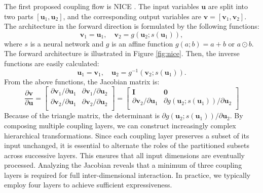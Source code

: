 The first proposed coupling flow is \ac{NICE} \citep{dinh2015nice}. The input variables $\boldsymbol{u}$ are split into two parts $[\boldsymbol{u}_1, \boldsymbol{u}_2]$, and the corresponding output variables are $\boldsymbol{v} = [\boldsymbol{v}_1, \boldsymbol{v}_2]$. The architecture in the forward direction is formulated by the following functions:
\begin{equation}
    \boldsymbol{v}_1 = \boldsymbol{u}_1, \quad \boldsymbol{v}_2 = g(\boldsymbol{u}_2;s(\boldsymbol{u}_1)),
\end{equation}
where $s$ is a neural network and $g$ is an affine function $g(a;b)=a+b$ or $a\odot b$. The forward architecture is illustrated in Figure \ref{fig:nice}.
Then, the inverse functions are easily calculated:
\begin{equation}
    \boldsymbol{u}_1 = \boldsymbol{v}_1,\quad \boldsymbol{u}_2 = g^{-1}(\boldsymbol{v}_2;s(\boldsymbol{u}_1)).
\end{equation}
From the above functions, the Jacobian matrix is:
\begin{equation}
\frac {\partial \boldsymbol{v}}{\partial \boldsymbol{u}}=\begin{bmatrix}
\partial \boldsymbol{v}_1/\partial \boldsymbol{u}_1 & \partial \boldsymbol{v}_1/\partial \boldsymbol{u}_2 \\
\partial \boldsymbol{v}_2/\partial \boldsymbol{u}_1 & \partial \boldsymbol{v}_2/\partial \boldsymbol{u}_2\\
\end{bmatrix}=\begin{bmatrix}
\boldsymbol{I} & \boldsymbol{0} \\
\partial \boldsymbol{v}_2/\partial \boldsymbol{u}_1 & \partial g(\boldsymbol{u}_2;s(\boldsymbol{u}_1))/\partial \boldsymbol{u}_2\\
\end{bmatrix}
\end{equation}
Because of the triangle matrix, the determinant is $ \partial g(\boldsymbol{u}_2;s(\boldsymbol{u}_1))/\partial \boldsymbol{u}_2$.
By composing multiple coupling layers, we can construct increasingly complex hierarchical transformations. Since each coupling layer preserves a subset of its input unchanged, it is essential to alternate the roles of the partitioned subsets across successive layers. This ensures that all input dimensions are eventually processed. Analyzing the Jacobian reveals that a minimum of three coupling layers is required for full inter-dimensional interaction. In practice, we typically employ four layers to achieve sufficient expressiveness.


